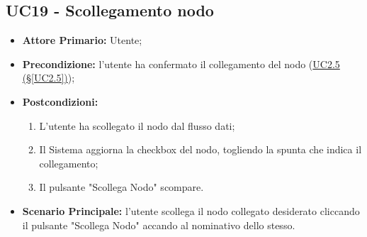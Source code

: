 \pagebreak

\subsection{UC19 - Scollegamento nodo}\label{UC19}
\begin{itemize}
	\item \textbf{Attore Primario:} Utente;
	\item \textbf{Precondizione:} l'utente ha confermato il collegamento del nodo (\hyperref[UC2.5]{UC2.5 									(§\ref*{UC2.5})});
	\item \textbf{Postcondizioni:}
	\begin{enumerate}
		\item L'utente ha scollegato il nodo dal flusso dati;
		\item Il Sistema aggiorna la checkbox del nodo, togliendo la spunta che indica il collegamento;
		\item Il pulsante "Scollega Nodo" scompare. 
	\end{enumerate}
	\item \textbf{Scenario Principale:} l'utente scollega il nodo collegato desiderato cliccando il pulsante "Scollega Nodo" accando al nominativo dello stesso.
\end{itemize}

\pagebreak

